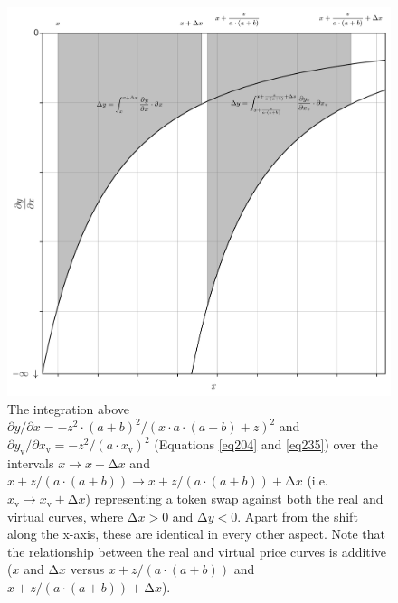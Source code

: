 \documentclass{article}
\begin{document}
\begin{figure}[ht]
    \centering
    \includegraphics[width=\textwidth]{fig45.png}
    \captionsetup{
        justification=raggedright,
        singlelinecheck=false,
        font=small,
        labelfont=bf,
        labelsep=quad,
        format=plain
    }
    \caption{The integration above $\partial y / \partial x = - z^{2} \cdot \left( a + b \right)^{2} / \left( x \cdot a \cdot \left( a + b \right) + z \right)^{2}$ and $\partial y_{\text{v}} / \partial x_{\text{v}} = - z^{2} / \left( a \cdot x_{\text{v}} \right)^{2}$  (Equations \ref{eq204} and \ref{eq235}) over the intervals $x \rightarrow x + \mathrm{\Delta}x$ and $x + z / \left( a \cdot \left( a + b \right) \right) \rightarrow x + z / \left( a \cdot \left( a + b \right) \right) + \mathrm{\Delta}x$ (i.e. $x_{\text{v}} \rightarrow x_{\text{v}} + \mathrm{\Delta}x$) representing a token swap against both the real and virtual curves, where $\mathrm{\Delta}x > 0$ and $\mathrm{\Delta}y < 0$. Apart from the shift along the x-axis, these are identical in every other aspect. Note that the relationship between the real and virtual price curves is additive ($x$ and $\mathrm{\Delta}x$ versus $x + z / \left( a \cdot \left( a + b \right) \right)$ and $x + z / \left( a \cdot \left( a + b \right) \right) + \mathrm{\Delta}x$).}
    \label{fig45}
\end{figure}
\end{document}
